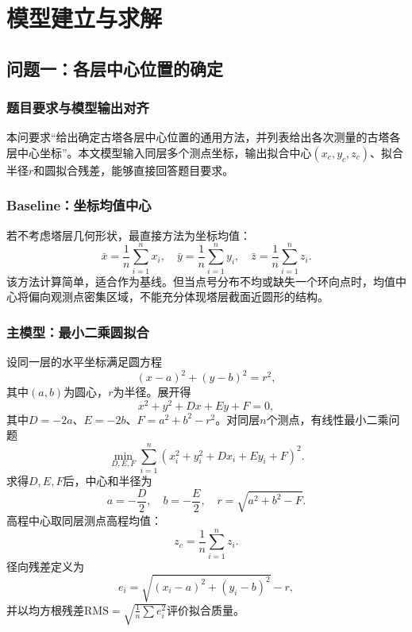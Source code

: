 \documentclass[UTF8,a4paper,12pt]{ctexart}
\begin{document}
\section{模型建立与求解}
\subsection{问题一：各层中心位置的确定}
\subsubsection{题目要求与模型输出对齐}
本问要求“给出确定古塔各层中心位置的通用方法，并列表给出各次测量的古塔各层中心坐标”。本文模型输入同层多个测点坐标，输出拟合中心$(x_c,y_c,z_c)$、拟合半径$r$和圆拟合残差，能够直接回答题目要求。

\subsubsection{Baseline：坐标均值中心}
若不考虑塔层几何形状，最直接方法为坐标均值：
\begin{equation}
\bar{x}=\frac{1}{n}\sum_{i=1}^{n}x_i,\quad
\bar{y}=\frac{1}{n}\sum_{i=1}^{n}y_i,\quad
\bar{z}=\frac{1}{n}\sum_{i=1}^{n}z_i.
\end{equation}
该方法计算简单，适合作为基线。但当点号分布不均或缺失一个环向点时，均值中心将偏向观测点密集区域，不能充分体现塔层截面近圆形的结构。

\subsubsection{主模型：最小二乘圆拟合}
设同一层的水平坐标满足圆方程
\begin{equation}
(x-a)^2+(y-b)^2=r^2,
\end{equation}
其中$(a,b)$为圆心，$r$为半径。展开得
\begin{equation}
x^2+y^2+Dx+Ey+F=0,
\end{equation}
其中$D=-2a$、$E=-2b$、$F=a^2+b^2-r^2$。对同层$n$个测点，有线性最小二乘问题
\begin{equation}
\min_{D,E,F}\sum_{i=1}^{n}\left(x_i^2+y_i^2+D x_i+E y_i+F\right)^2.
\end{equation}
求得$D,E,F$后，中心和半径为
\begin{equation}
a=-\frac{D}{2},\quad b=-\frac{E}{2},\quad r=\sqrt{a^2+b^2-F}.
\end{equation}
高程中心取同层测点高程均值：
\begin{equation}
z_c=\frac{1}{n}\sum_{i=1}^{n}z_i.
\end{equation}
径向残差定义为
\begin{equation}
e_i=\sqrt{(x_i-a)^2+(y_i-b)^2}-r,
\end{equation}
并以均方根残差$\mathrm{RMS}=\sqrt{\frac1n\sum e_i^2}$评价拟合质量。
\end{document}
